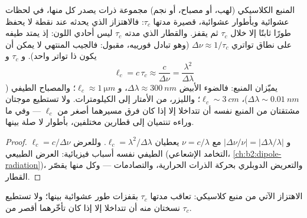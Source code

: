 \begin{proposition}\label{prop:b2:scalar-light-model:coherence}
المنبع الكلاسيكي (لهب، أو مصباح، أو نجم) مجموعة ذرات
يصدر كل منها، في لحظات عشوائية وبأطوار عشوائية،
\emph{} قصيرة مدتها $\tau_c$: فالاهتزاز الذي يحدثه عند
نقطة لا يحفظ طورًا ثابتًا إلا خلال $\tau_c$ ثم يقفز. والقطار
الذي مدته $\tau_c$ ليس أحادي اللون: إذ يمتد طيفه على نطاق
تواتري $\Delta\nu \approx 1/\tau_c$ (وهو تبادل فورييه، مقبول: فالجيب
المنتهي لا يمكن أن يكون ذا تواتر واحد). و\emph{}
$\tau_c$ و\emph{}
\[
\ell_c = c\,\tau_c \approx \frac c{\Delta\nu} = \frac{\lambda^2}{\Delta\lambda}
\]
يميّزان المنبع: فالضوء الأبيض $\Delta\lambda \approx \qty{300}{nm}$، و $\ell_c
\approx \qty{1}{\micro m}$؛ والمصباح الطيفي ($\Delta\lambda \sim \qty{0.01}{nm}$)، $\ell_c \sim
\qty{3}{cm}$؛ والليزر، من الأمتار إلى الكيلومترات. ولا تستطيع موجتان مشتقتان من
المنبع نفسه أن تتداخلا إلا إذا كان فرق مسيرهما أصغر
من $\ell_c$ --- وفي ما وراءه تنتميان إلى قطارين مختلفين، بأطوار
لا صلة بينها.
\end{proposition}

\begin{proof}
$\ell_c = c/\Delta\nu$ و $|\Delta\nu/\nu| = |\Delta\lambda/\lambda|$ مع $\nu = c/\lambda$ يعطيان $\ell_c =
\lambda^2/\Delta\lambda$. وللعرض الطيفي نفسه أسباب فيزيائية: العرض
الطبيعي (التخامد الإشعاعي، \cref{ch:b2:dipole-radiation})، والتعريض
الدوبلري بحركة الذرات الحرارية، والتصادمات --- وكل منها
يقصّر القطار.
\end{proof}

\begin{omfigure}

{\small الاهتزاز الآتي من منبع كلاسيكي: تعاقب  مدتها $\tau_c$ بقفزات طور عشوائية بينها؛ ولا تستطيع نسختان
منه أن تتداخلا إلا إذا كان تأخّرهما أقصر من $\tau_c$.}
\end{omfigure}

